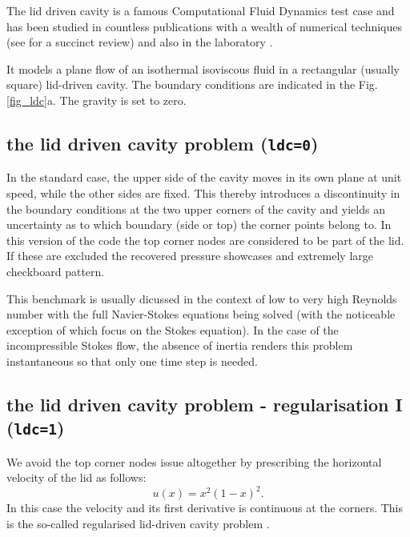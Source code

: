 

The lid driven cavity is a famous Computational Fluid Dynamics test case 
\cite{kawa61,ghgs82,paac67,bope98,brsa06,grdn,shde00}
and has been studied in countless publications with a wealth of numerical techniques
(see \cite{ertu09} for a succinct review) and also in the laboratory \cite{kost84}.

It models a plane flow of an isothermal isoviscous fluid in a rectangular (usually square) lid-driven cavity. 
The boundary conditions are indicated in the Fig. \ref{fig_ldc}a. The gravity is set to zero.

\subsection{the lid driven cavity problem ({\tt ldc=0})}
In the standard case, the upper side of the cavity moves in its own plane at unit speed, while the other sides are fixed.
This thereby introduces a discontinuity in the boundary conditions at the two upper corners of the cavity and yields
an uncertainty as to which boundary (side or top) the corner points belong to. 
In this version of the code the top corner nodes are considered to be part of the lid. If these are excluded 
the recovered pressure showcases and extremely large checkboard pattern.

This benchmark is usually dicussed in the context of low to very high Reynolds number with the full 
Navier-Stokes equations being solved (with the noticeable exception of \cite{sagl81a,sagl81b,chpc95,eid2005}
which focus on the Stokes equation). 
In the case of the incompressible Stokes flow, 
the absence of inertia renders this problem instantaneous so that only one time step is needed.

\subsection{the lid driven cavity problem - regularisation I ({\tt ldc=1})}

We avoid the top corner nodes issue altogether by  
prescribing the horizontal velocity of the lid as follows: 
\begin{equation}
u(x)=x^2(1-x)^2.
\end{equation}
In this case the velocity and its first derivative is continuous at the corners. This is the so-called regularised lid-driven cavity problem \cite{piva94}.

